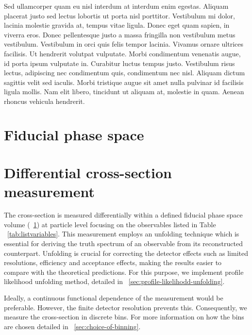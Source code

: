 Sed ullamcorper quam eu nisl interdum at interdum enim egestas. Aliquam placerat justo sed lectus lobortis ut porta nisl porttitor. Vestibulum mi dolor, lacinia molestie gravida at, tempus vitae ligula. Donec eget quam sapien, in viverra eros. Donec pellentesque justo a massa fringilla non vestibulum metus vestibulum. Vestibulum in orci quis felis tempor lacinia. Vivamus ornare ultrices facilisis. Ut hendrerit volutpat vulputate. Morbi condimentum venenatis augue, id porta ipsum vulputate in. Curabitur luctus tempus justo. Vestibulum risus lectus, adipiscing nec condimentum quis, condimentum nec nisl. Aliquam dictum sagittis velit sed iaculis. Morbi tristique augue sit amet nulla pulvinar id facilisis ligula mollis. Nam elit libero, tincidunt ut aliquam at, molestie in quam. Aenean rhoncus vehicula hendrerit.

\section{Fiducial phase space}
\label{sec:fiducial-phase-space}

\section{Differential cross-section measurement}
\label{sec:diff-xsec-measurement}
The cross-section is measured differentially within a defined fiducial phase space volume (~\cref{sec:fiducial-phase-space}) at particle level focusing on the observables listed in Table ~\cref{tab:listvariables}. This measurement employs an unfolding technique which is essential for deriving the truth spectrum of an observable from its reconstructed counterpart. Unfolding is crucial for correcting the detector effects such as limited resolutions, efficiency and acceptance effects, making the results easier to compare with the theoretical predictions. For this purpose, we implement profile likelihood unfolding method, detailed in ~\cref{sec:profile-likelihodd-unfolding}. 

Ideally, a continuous functional dependence of the measurement would be preferable. However, the finite detector resolution prevents this. Consequently, we measure the cross-section in discrete bins. For more information on how the bins are chosen detailed in ~\cref{sec:choice-of-binning}.

